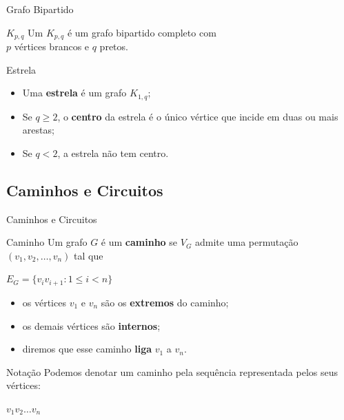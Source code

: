 \documentclass[xcolor=dvipsnames,table]{beamer}
\begin{document}
	\begin{frame}{Grafo Bipartido}
		\begin{block}{$K_{p,q}$}
			Um $K_{p,q}$ é um grafo bipartido completo com \\$p$ vértices brancos e $q$ pretos.
		\end{block}
		\begin{block}{Estrela}
			\begin{itemize}
				\item Uma {\bf estrela} é um grafo $K_{1,q}$; 
				\item Se $q \geq 2$, o {\bf centro} da estrela é o único vértice que incide em duas ou mais arestas; 
				\item Se $q < 2$, a estrela não tem centro.
			\end{itemize}
		\end{block}
	\end{frame}

	\subsection{Caminhos e Circuitos}
	\begin{frame}[shrink]{Caminhos e Circuitos}
		\begin{block}{Caminho}
			Um grafo $G$ é um {\bf caminho} se $V_G$ admite uma permutação $(v_1, v_2, \ldots , v_n)$ tal que
			\begin{center}
				$E_G = \{ v_i v_{i +1} : 1 \leq i < n \}$
			\end{center} 
			\begin{itemize}
				\item os vértices $v_1$ e $v_n$ são os {\bf extremos} do caminho; 
				\item os demais vértices são {\bf internos};  
				\item diremos que esse caminho {\bf liga} $v_1$ a $v_n$.
			\end{itemize}
		\end{block}  
		\begin{block}{Notação}
			Podemos denotar um caminho pela sequência representada pelos seus vértices: 
			\begin{center}
				$v_1 v_2 \ldots v_n$		
			\end{center}
		\end{block}
	\end{frame}
	
\end{document}
